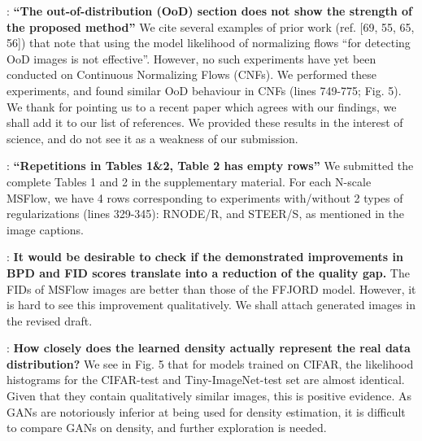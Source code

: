 \documentclass[rebuttal]{cvpr}
\begin{document}
\ra : \textbf{“The out-of-distribution (OoD) section does not show the strength of the proposed method”}
We cite several examples of prior work (ref. [69, 55, 65, 56]) that note that using the model likelihood of normalizing flows ``for detecting OoD images is not effective''. However, no such experiments have yet been conducted on Continuous Normalizing Flows (CNFs). We performed these experiments, and found similar OoD behaviour in CNFs (lines 749-775; Fig. 5). We thank \ra{} for pointing us to a recent paper which agrees with our findings, we shall add it to our list of references. We provided these results in the interest of science, and do not see it as a weakness of our submission.


\ra : \textbf{“Repetitions in Tables 1\&2, Table 2 has empty rows”}
We submitted the complete Tables 1 and 2 in the supplementary material. For each N-scale MSFlow, we have 4 rows corresponding to experiments with/without 2 types of regularizations (lines 329-345): RNODE/R, and STEER/S, as mentioned in the image captions.




\rc : \textbf{It would be desirable to check if the demonstrated improvements in BPD and FID scores translate into a reduction of the quality gap.}
The FIDs of MSFlow images are better than those of the FFJORD model. However, it is hard to see this improvement qualitatively. We shall attach generated images in the revised draft.

\rc : \textbf{How closely does the learned density actually represent the real data distribution?}
We see in Fig. 5 that for models trained on CIFAR, the likelihood histograms for the CIFAR-test and Tiny-ImageNet-test set are almost identical. Given that they contain qualitatively similar images, this is positive evidence. As GANs are notoriously inferior at being used for density estimation, it is difficult to compare GANs on density, and further exploration is needed.
\end{document}
